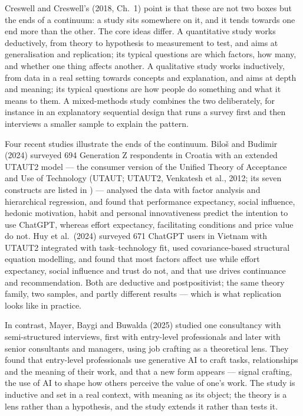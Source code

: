 \documentclass[11pt,a4paper,british,twoside=false,headings=small,chapterprefix=false,numbers=noenddot]{scrbook}
\begin{document}
Creswell and Creswell's (2018, Ch.\ 1) point is that these are not two boxes but the ends of a continuum: a study sits somewhere on it, and it tends towards one end more than the other. The core ideas differ. A quantitative study works deductively, from theory to hypothesis to measurement to test, and aims at generalisation and replication; its typical questions are which factors, how many, and whether one thing affects another. A qualitative study works inductively, from data in a real setting towards concepts and explanation, and aims at depth and meaning; its typical questions are how people do something and what it means to them. A mixed-methods study combines the two deliberately, for instance in an explanatory sequential design that runs a survey first and then interviews a smaller sample to explain the pattern.

Four recent studies illustrate the ends of the continuum. Biloš and Budimir (2024) surveyed 694 Generation Z respondents in Croatia with an extended UTAUT2 model --- the consumer version of the Unified Theory of Acceptance and Use of Technology (UTAUT; UTAUT2, Venkatesh et al., 2012; its seven constructs are listed in ) --- analysed the data with factor analysis and hierarchical regression, and found that performance expectancy, social influence, hedonic motivation, habit and personal innovativeness predict the intention to use ChatGPT, whereas effort expectancy, facilitating conditions and price value do not. Huy et al.\ (2024) surveyed 671 ChatGPT users in Vietnam with UTAUT2 integrated with task--technology fit, used covariance-based structural equation modelling, and found that most factors affect use while effort expectancy, social influence and trust do not, and that use drives continuance and recommendation. Both are deductive and postpositivist; the same theory family, two samples, and partly different results --- which is what replication looks like in practice.

In contrast, Mayer, Baygi and Buwalda (2025) studied one consultancy with semi-structured interviews, first with entry-level professionals and later with senior consultants and managers, using job crafting as a theoretical lens. They found that entry-level professionals use generative AI to craft tasks, relationships and the meaning of their work, and that a new form appears --- signal crafting, the use of AI to shape how others perceive the value of one's work. The study is inductive and set in a real context, with meaning as its object; the theory is a lens rather than a hypothesis, and the study extends it rather than tests it.
\end{document}
